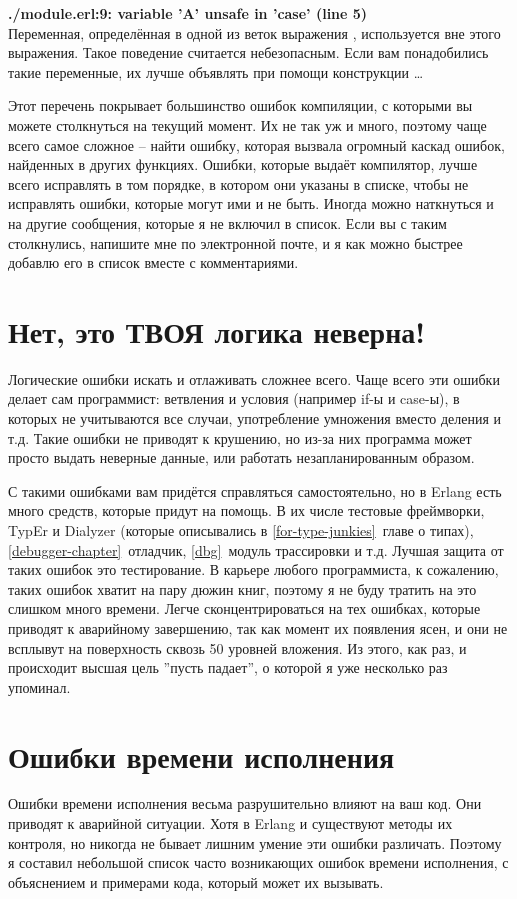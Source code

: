 \blankline
\begin{minipage}{\textwidth}
    \textbf{./module.erl:9: variable 'A' unsafe in 'case' (line 5)}\\
    Переменная, определённая в одной из веток выражения , используется вне этого выражения. Такое поведение считается небезопасным. Если вам понадобились такие переменные, их лучше объявлять при помощи конструкции \ldots
\end{minipage}

Этот перечень покрывает большинство ошибок компиляции, с которыми вы можете столкнуться на текущий момент. Их не так уж и много, поэтому чаще всего самое сложное \--- найти ошибку, которая вызвала огромный каскад ошибок, найденных в других функциях. Ошибки, которые выдаёт компилятор, лучше всего исправлять в том порядке, в котором они указаны в списке, чтобы не исправлять ошибки, которые могут ими и не быть. Иногда можно наткнуться и на другие сообщения, которые я не включил в список. Если вы с таким столкнулись, напишите мне по электронной почте, и я как можно быстрее добавлю его в список вместе с комментариями.
\section{Нет, это ТВОЯ логика неверна!}
\label{no-your-logic-is-wrong}
Логические ошибки искать и отлаживать сложнее всего. Чаще всего эти ошибки делает сам программист: ветвления и условия (например if\--ы и case\--ы), в которых не учитываются все случаи, употребление умножения вместо деления и т.д. Такие ошибки не приводят к крушению, но из\--за них программа может просто выдать неверные данные, или работать незапланированным образом.

С такими ошибками вам придётся справляться самостоятельно, но в Erlang есть много средств, которые придут на помощь. В их числе тестовые фреймворки, TypEr и Dialyzer (которые описывались в \ref{for-type-junkies}~главе о типах), \ref{debugger-chapter}~отладчик, \ref{dbg}~модуль трассировки и т.д. Лучшая защита от таких ошибок это тестирование. В карьере любого программиста, к сожалению, таких ошибок хватит на пару дюжин книг, поэтому я не буду тратить на это слишком много времени. Легче сконцентрироваться на тех ошибках, которые приводят к аварийному завершению, так как момент их появления ясен, и они не всплывут на поверхность сквозь 50 уровней вложения. Из этого, как раз, и происходит высшая цель ''пусть падает'', о которой я уже несколько раз упоминал.
\section{Ошибки времени исполнения}
\label{run-time-errors}
Ошибки времени исполнения весьма разрушительно влияют на ваш код. Они приводят к аварийной ситуации. Хотя в Erlang и существуют методы их контроля, но никогда не бывает лишним умение эти ошибки различать. Поэтому я составил небольшой список часто возникающих ошибок времени исполнения, с объяснением и примерами кода, который может их вызывать.

